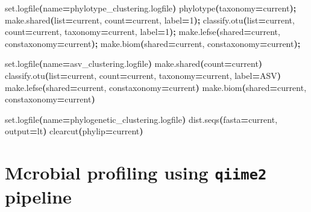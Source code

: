 \documentclass[
  12pt,
  openany]{book}
\newenvironment{Shaded}{\begin{snugshade}}{\end{snugshade}}
\newcommand{\ErrorTok}[1]{\textcolor[rgb]{0.64,0.00,0.00}{\textbf{#1}}}
\newcommand{\ExtensionTok}[1]{#1}
\newcommand{\KeywordTok}[1]{\textcolor[rgb]{0.13,0.29,0.53}{\textbf{#1}}}
\newcommand{\NormalTok}[1]{#1}
\newcommand{\OperatorTok}[1]{\textcolor[rgb]{0.81,0.36,0.00}{\textbf{#1}}}
\newcommand{\VariableTok}[1]{\textcolor[rgb]{0.00,0.00,0.00}{#1}}
\begin{document}
\begin{Shaded}
\begin{Highlighting}[]
\ExtensionTok{set.logfile}\ErrorTok{(}\VariableTok{name}\OperatorTok{=}\NormalTok{phylotype\_clustering.logfile}\KeywordTok{)}
\ExtensionTok{phylotype}\ErrorTok{(}\VariableTok{taxonomy}\OperatorTok{=}\NormalTok{current}\KeywordTok{);}
\ExtensionTok{make.shared}\ErrorTok{(}\VariableTok{list}\OperatorTok{=}\NormalTok{current, }\VariableTok{count}\OperatorTok{=}\NormalTok{current, }\VariableTok{label}\OperatorTok{=}\NormalTok{1}\KeywordTok{);}
\ExtensionTok{classify.otu}\ErrorTok{(}\VariableTok{list}\OperatorTok{=}\NormalTok{current, }\VariableTok{count}\OperatorTok{=}\NormalTok{current, }\VariableTok{taxonomy}\OperatorTok{=}\NormalTok{current, }\VariableTok{label}\OperatorTok{=}\NormalTok{1}\KeywordTok{);}
\ExtensionTok{make.lefse}\ErrorTok{(}\VariableTok{shared}\OperatorTok{=}\NormalTok{current, }\VariableTok{constaxonomy}\OperatorTok{=}\NormalTok{current}\KeywordTok{);}
\ExtensionTok{make.biom}\ErrorTok{(}\VariableTok{shared}\OperatorTok{=}\NormalTok{current, }\VariableTok{constaxonomy}\OperatorTok{=}\NormalTok{current}\KeywordTok{);}

\ExtensionTok{set.logfile}\ErrorTok{(}\VariableTok{name}\OperatorTok{=}\NormalTok{asv\_clustering.logfile}\KeywordTok{)}
\ExtensionTok{make.shared}\ErrorTok{(}\VariableTok{count}\OperatorTok{=}\NormalTok{current}\KeywordTok{)}
\ExtensionTok{classify.otu}\ErrorTok{(}\VariableTok{list}\OperatorTok{=}\NormalTok{current, }\VariableTok{count}\OperatorTok{=}\NormalTok{current, }\VariableTok{taxonomy}\OperatorTok{=}\NormalTok{current, }\VariableTok{label}\OperatorTok{=}\NormalTok{ASV}\KeywordTok{)}
\ExtensionTok{make.lefse}\ErrorTok{(}\VariableTok{shared}\OperatorTok{=}\NormalTok{current, }\VariableTok{constaxonomy}\OperatorTok{=}\NormalTok{current}\KeywordTok{)}
\ExtensionTok{make.biom}\ErrorTok{(}\VariableTok{shared}\OperatorTok{=}\NormalTok{current, }\VariableTok{constaxonomy}\OperatorTok{=}\NormalTok{current}\KeywordTok{)}

\ExtensionTok{set.logfile}\ErrorTok{(}\VariableTok{name}\OperatorTok{=}\NormalTok{phylogenetic\_clustering.logfile}\KeywordTok{)}
\ExtensionTok{dist.seqs}\ErrorTok{(}\VariableTok{fasta}\OperatorTok{=}\NormalTok{current, }\VariableTok{output}\OperatorTok{=}\NormalTok{lt}\KeywordTok{)}
\ExtensionTok{clearcut}\ErrorTok{(}\VariableTok{phylip}\OperatorTok{=}\NormalTok{current}\KeywordTok{)}
\end{Highlighting}
\end{Shaded}

\hypertarget{mcrobial-profiling-using-qiime2-pipeline}{%
\chapter{\texorpdfstring{Mcrobial profiling using \texttt{qiime2} pipeline}{Mcrobial profiling using qiime2 pipeline}}\label{mcrobial-profiling-using-qiime2-pipeline}}
\end{document}

